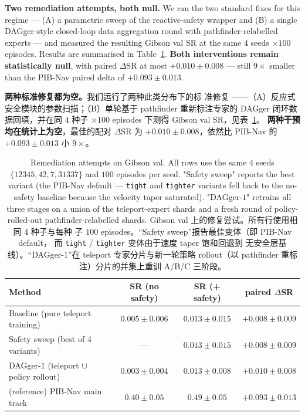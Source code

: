 \documentclass[11pt,a4paper]{article}
\newcommand{\en}[1]{\par\noindent #1\par\vspace{0.15em}}
\newcommand{\zh}[1]{\par\noindent\color{zhcol}\hspace{0.5em}#1\par\color{black}\vspace{0.6em}}
\begin{document}
\en{\textbf{Two remediation attempts, both null.}
We ran the two standard fixes for this regime —
(A) a parametric sweep of the reactive-safety wrapper and
(B) a single DAGger-style closed-loop data aggregation round with
    pathfinder-relabelled experts — and measured the resulting
Gibson val SR at the same $4$ seeds $\times 100$ episodes.
Results are summarised in Table~\ref{tab:gibson-remediation}.
\textbf{Both interventions remain statistically null}, with paired
$\Delta\mathrm{SR}$ at most $+0.010 \pm 0.008$ — still $9\times$
smaller than the PIB-Nav paired delta of $+0.093 \pm 0.013$.}

\zh{\textsf{\textbf{两种标准修复都为空。}我们运行了两种此类分布下的标
准修复 ——（A）反应式安全模块的参数扫描；（B）单轮基于 pathfinder
重新标注专家的 DAGger 闭环数据回填，并在同 $4$ 种子 $\times 100$
episodes 下测得 Gibson val SR，见表~\ref{tab:gibson-remediation}。
\textbf{两种干预均在统计上为空}，最佳的配对 $\Delta\mathrm{SR}$ 为
$+0.010 \pm 0.008$，依然比 PIB-Nav 的 $+0.093 \pm 0.013$ 小
$9\times$。}}

\begin{table}[H]
\centering\small
\caption{Remediation attempts on Gibson val. All rows use the same
$4$ seeds $\{12345, 42, 7, 31337\}$ and $100$ episodes per seed.
"Safety sweep" reports the best variant (the PIB-Nav default —
\texttt{tight} and \texttt{tighter} variants fell back to the no-safety
baseline because the velocity taper saturated). "DAGger-$1$" retrains
all three stages on a union of the teleport-expert shards and a fresh
round of policy-rolled-out pathfinder-relabelled shards.
\textsf{\small Gibson val 上的修复尝试。所有行使用相同 $4$ 种子与每种
子 $100$ episodes。“Safety sweep”报告最佳变体（即 PIB-Nav default，
而 \texttt{tight} / \texttt{tighter} 变体由于速度 taper 饱和回退到
无安全层基线）。“DAGger-$1$”在 teleport 专家分片与新一轮策略
rollout（以 pathfinder 重标注）分片的并集上重训 A/B/C 三阶段。}}
\label{tab:gibson-remediation}
\begin{tabular}{lccc}
\toprule
Method & SR (no safety) & SR (+ safety) & paired $\Delta$SR \\
\midrule
Baseline (pure teleport training)         & $0.005\pm 0.006$ & $0.013\pm 0.015$ & $+0.008\pm 0.009$ \\
Safety sweep (best of 4 variants)         & — & $0.013\pm 0.015$ & $+0.008\pm 0.009$ \\
DAGger-$1$ (teleport $\cup$ policy rollout) & $0.003\pm 0.004$ & $0.013\pm 0.008$ & $+0.010\pm 0.008$ \\
\midrule
(reference) PIB-Nav main track            & $0.40\pm 0.05$ & $0.49\pm 0.05$ & $\mathbf{+0.093\pm 0.013}$ \\
\bottomrule
\end{tabular}
\end{table}
\end{document}
